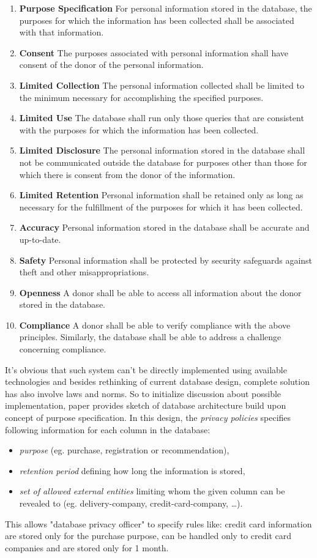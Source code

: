 \documentclass[a4paper]{article}
\begin{document}
\begin{enumerate} \itemsep=-\parskip
\item \textbf{Purpose Specification}
For personal information stored in the database, the purposes for which the
information has been collected shall be associated with that information.
\item \textbf{Consent}
The purposes associated with personal information shall have
consent of the donor of the personal information.
\item \textbf{Limited Collection}
The personal information collected shall be limited to the minimum necessary
for accomplishing the specified purposes.
\item \textbf{Limited Use}
The database shall run only those queries that are consistent with the purposes
for which the information has been collected.
\item \textbf{Limited Disclosure}
The personal information stored in the database shall not be communicated
outside the database for purposes other than those for which there
is consent from the donor of the information.
\item \textbf{Limited Retention}
Personal information shall be retained only as long as necessary for the
fulfillment of the purposes for which it has been collected.
\item \textbf{Accuracy}
Personal information stored in the database shall be accurate and up-to-date.
\item \textbf{Safety}
Personal information shall be protected by security safeguards against theft
and other misappropriations.
\item \textbf{Openness}
A donor shall be able to access all information about the donor stored in the
database.
\item \textbf{Compliance}
A donor shall be able to verify compliance with the
above principles. Similarly, the database
shall be able to address a challenge concerning compliance.
\end{enumerate}

It's obvious that such system can't be directly
implemented using available technologies and besides rethinking of current
database design, complete solution has also involve laws and norms.
So to initialize discussion about possible implementation, paper provides sketch
of database architecture build upon concept of purpose specification.
In this design, the \emph{privacy policies} specifies following information
for each column in the database:
\begin{itemize} \itemsep=-\parskip
\item \emph{purpose} (eg. purchase, registration or recommendation),
\item \emph{retention period} defining how long the information is stored,
\item \emph{set of allowed external entities}
limiting whom the given column can be revealed to (eg. delivery-company,
credit-card-company, \dots).
\end{itemize}
This allows "database privacy officer" to specify rules like: credit card
information are stored only for the purchase purpose, can be handled
only to credit card companies and are stored only for 1 month.
\end{document}
